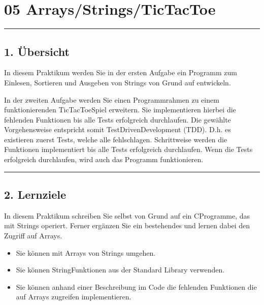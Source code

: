 \documentclass[a4paper,10pt,english]{report}
\begin{document}
\chapter{05 \sphinxhyphen{} Arrays/Strings/TicTacToe}
\label{\detokenize{P05_TicTacToe/README:arrays-strings-tictactoe}}\label{\detokenize{P05_TicTacToe/README::doc}}

\bigskip\hrule\bigskip



\section{1. Übersicht}
\label{\detokenize{P05_TicTacToe/README:ubersicht}}
\sphinxAtStartPar
In diesem Praktikum werden Sie in der ersten Aufgabe ein Programm zum Einlesen, Sortieren und Ausgeben von Strings von Grund auf entwickeln.

\sphinxAtStartPar
In der zweiten Aufgabe werden Sie einen Programmrahmen zu einem funktionierenden TicTacToe\sphinxhyphen{}Spiel erweitern. Sie implementieren hierbei die fehlenden Funktionen bis alle Tests erfolgreich durchlaufen. Die gewählte Vorgehensweise entspricht somit Test\sphinxhyphen{}Driven\sphinxhyphen{}Development (TDD). D.h. es existieren zuerst Tests, welche alle fehlschlagen. Schrittweise werden die Funktionen implementiert bis alle Tests erfolgreich durchlaufen. Wenn die Tests erfolgreich durchlaufen, wird auch das Programm funktionieren.


\bigskip\hrule\bigskip



\section{2. Lernziele}
\label{\detokenize{P05_TicTacToe/README:lernziele}}
\sphinxAtStartPar
In diesem Praktikum schreiben Sie selbst von Grund auf ein C\sphinxhyphen{}Programme, das mit Strings operiert. Ferner ergänzen Sie ein bestehendes und lernen dabei den Zugriff auf Arrays.
\begin{itemize}
\item {} 
\sphinxAtStartPar
Sie können mit Arrays von Strings umgehen.

\item {} 
\sphinxAtStartPar
Sie können String\sphinxhyphen{}Funktionen aus der Standard Library verwenden.

\item {} 
\sphinxAtStartPar
Sie können anhand einer Beschreibung im Code die fehlenden Funktionen die auf Arrays zugreifen implementieren.

\end{itemize}
\end{document}
